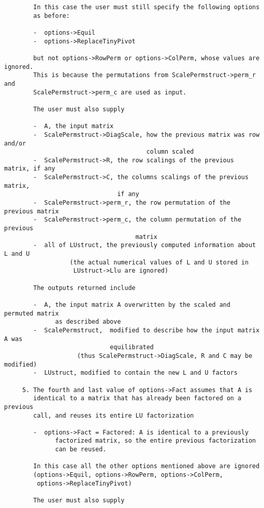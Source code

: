 \begin{verbatim}
        In this case the user must still specify the following options
        as before:
  
        -  options->Equil
        -  options->ReplaceTinyPivot
  
        but not options->RowPerm or options->ColPerm, whose values are ignored.
        This is because the permutations from ScalePermstruct->perm_r and
        ScalePermstruct->perm_c are used as input.
  
        The user must also supply 
  
        -  A, the input matrix
        -  ScalePermstruct->DiagScale, how the previous matrix was row and/or
                                       column scaled
        -  ScalePermstruct->R, the row scalings of the previous matrix, if any
        -  ScalePermstruct->C, the columns scalings of the previous matrix, 
                               if any
        -  ScalePermstruct->perm_r, the row permutation of the previous matrix
        -  ScalePermstruct->perm_c, the column permutation of the previous 
                                    matrix
        -  all of LUstruct, the previously computed information about L and U
                  (the actual numerical values of L and U stored in
                   LUstruct->Llu are ignored)
  
        The outputs returned include
           
        -  A, the input matrix A overwritten by the scaled and permuted matrix
              as described above
        -  ScalePermstruct,  modified to describe how the input matrix A was
                             equilibrated 
                    (thus ScalePermstruct->DiagScale, R and C may be modified)
        -  LUstruct, modified to contain the new L and U factors
  
     5. The fourth and last value of options->Fact assumes that A is
        identical to a matrix that has already been factored on a previous 
        call, and reuses its entire LU factorization
  
        -  options->Fact = Factored: A is identical to a previously
              factorized matrix, so the entire previous factorization
              can be reused.
  
        In this case all the other options mentioned above are ignored
        (options->Equil, options->RowPerm, options->ColPerm, 
         options->ReplaceTinyPivot)
  
        The user must also supply 
  

\end{verbatim}
